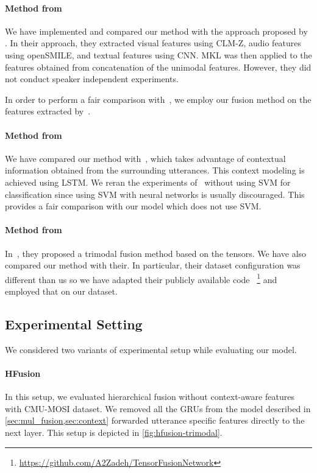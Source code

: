 \documentclass[review]{elsarticle}
\newcommand\?[1]{\hl{#1}}
\begin{document}
\paragraph{Method from~\citep{pordee}}
We have implemented and compared our method with the approach proposed by
\citet{pordee}. In their approach, they extracted visual features using
CLM-Z, audio features using openSMILE, and textual features using CNN. MKL was then applied to the features obtained from
concatenation of the unimodal features. However, they did not conduct speaker
independent experiments.

In order to perform a fair comparison with~\citep{pordee}, we
employ our fusion method on the features extracted by~\citet{pordee}.



\paragraph{Method from~\citep{porcon}}
We have compared our method with~\citep{pordep}, which takes
advantage of contextual information obtained from the surrounding
utterances. This context modeling is achieved using LSTM. We reran the
experiments of~\citet{pordep} without using SVM for classification since using
SVM with neural networks is usually discouraged. This provides a fair comparison
with our model which does not use SVM.

\paragraph{Method from~\citep{zadten}}
In~\citep{zadten}, they proposed a trimodal fusion method based on the tensors. We have also compared our method with their. In particular, their dataset configuration was different than us so we have adapted their publicly available code ~\footnote{\url{https://github.com/A2Zadeh/TensorFusionNetwork}} and employed that on our dataset.
\subsection{Experimental Setting}
\label{sec:exp_set}

We considered two variants of experimental setup while evaluating our model.

\paragraph{HFusion} In this setup, we evaluated hierarchical fusion
without context-aware features with CMU-MOSI dataset. We removed all the GRUs
from the model described in \cref{sec:mul_fusion,sec:context} forwarded
utterance specific features directly to the next layer. This setup is depicted
in \cref{fig:hfusion-trimodal}. 
\end{document}
